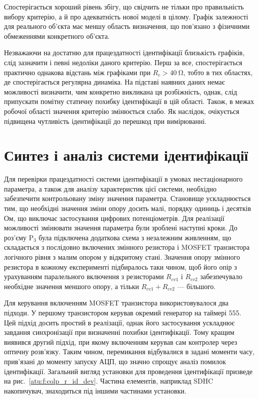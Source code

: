 Спостерігається хороший рівень збігу, що свідчить не тільки
про правильність вибору критерію, а й про адекватність нової
моделі в цілому. Графік залежності для реального об'єкта має
меншу область визначення, що пов'язано з фізичними обмеженнями
конкретного об'єкта.

Незважаючи на достатню для працездатності ідентифікації
близькість графіків, слід зазначити і певні недоліки даного
критерію. Перш за все, спостерігається практично однакова
відстань між графіками при
$R_c> \SI{40}{\ohm} $, тобто в тих областях, де спостерігається регулярна
динаміка. На підставі наявних даних немає можливості визначити,
чим конкретно викликана ця розбіжність, однак, слід припускати
помітну статичну похибку ідентифікації в цій області. Також, в
межах робочої області значення критерію змінюється слабо. Як
наслідок, очікується підвищена чутливість ідентифікації до
перешкод при вимірюванні.


\section{Синтез і аналіз системи ідентифікації} %


Для перевірки працездатності системи ідентифікації в умовах
нестаціонарного параметра, а також для аналізу характеристик
цієї системи, необхідно забезпечити контрольовану зміну
значення параметра. Становище ускладнюється тим, що необхідні
значення зміни опору досить малі, порядку одиниць і десятків
Ом, що виключає застосування цифрових потенціометрів. Для
реалізації можливості змінювати значення параметра були
зроблені наступні кроки. До роз'єму
$\mathrm{P}_3 $ була підключена додаткова схема з незалежним
живленням, що складається з послідовно включених змінного
резистора і MOSFET транзистора логічного рівня з малим опором у
відкритому стані. Значення опору змінного резистора в кожному
експерименті підбиралось таки чином, щоб його опір з урахуванням
паралельного включення з резисторами
$R_{cv1} $ і
$R_{cv2} $ забезпечувало необхідне значення меншого опору, а тільки
$R_{cv1} + R_{cv2 } $ --- більшого.

Для керування включенням MOSFET транзистора використовувалося
два підходи. У першому транзистором керував окремий генератор
на таймері 555. Цей підхід досить простий в реалізації, однак
його застосування ускладнює завдання синхронізації при
визначенні похибки ідентифікації. Тому кращим виявився
другий підхід, при якому включенням керував сам контролер
через оптичну розв'язку. Таким чином, перемикання відбувалися
в задані моменти часу, прив'язані до моменту запуску АЦП,
що значно спрощує аналіз помилок ідентифікації. Загальний
вигляд установки для проведення ідентифікації призведе на
рис.~\ref{atu:f:colp_r_id_dev}. Частина елементів, наприклад SDHC накопичувач,
знаходиться під іншими частинами установки.


